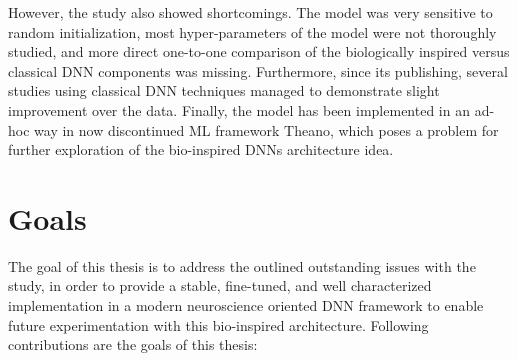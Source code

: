 However, the \citeauthor{antolik} \citeyear{antolik} study also showed shortcomings. The model was very sensitive to random initialization, most hyper-parameters of the model were not thoroughly studied, and more direct one-to-one comparison of the biologically inspired versus classical DNN components was missing. Furthermore, since its publishing, several studies using classical DNN techniques managed to demonstrate slight improvement over the \citeauthor{antolik} data. Finally, the model has been implemented in an ad-hoc way in now discontinued ML framework Theano, which poses a problem for further exploration of the bio-inspired DNNs architecture idea.

\section*{Goals}
The goal of this thesis is to address the outlined outstanding issues with the \citeauthor{antolik} study, in order to provide a stable, fine-tuned, and well characterized implementation in a modern neuroscience oriented DNN framework to enable future experimentation with this bio-inspired architecture. Following contributions are the goals of this thesis:

